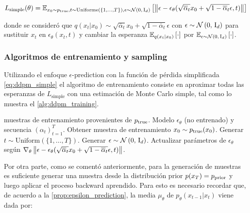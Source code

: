 \begin{equation}
    \label{eq:ddpm_simple}
    L_{\text{simple}}(\theta) = \mathbb{E}_{x_0\sim p_{\operatorname{true}},t\sim\operatorname{Uniforme}\left(\{1,\ldots,T\}\right),\epsilon\sim\mathcal{N}\left(0,\,\operatorname{I}_{d}\right)}\left[\left\lVert \epsilon-\epsilon_\theta(\sqrt{\overline{\alpha}_t}x_0+\sqrt{1-\overline{\alpha}_t}\epsilon,t) \right\rVert\right]
\end{equation}

donde se consideró que $q(x_t|x_0)\sim \sqrt{\overline{\alpha}_t}x_0 + \sqrt{1-\overline{\alpha}_t}\epsilon$ con $\epsilon\sim\mathcal{N}\left(0,\,\operatorname{I}_{d}\right)$ para sustituir $x_t$ en $\epsilon_\theta(x_t,t)$ y cambiar la esperanza $\mathbb{E}_{q(x_t|x_0)}\left[\cdot\right]$ por $\mathbb{E}_{\epsilon\sim\mathcal{N}\left(0,\,\operatorname{I}_{d}\right)}\left[\cdot\right]$.

\subsubsection{Algoritmos de entrenamiento y sampling}

Utilizando el enfoque $\epsilon$-prediction con la función de pérdida simplificada \eqref{eq:ddpm_simple} el algoritmo de entrenamiento consiste en aproximar todas las esperanzas de $L_\text{simple}$ con una estimación de Monte Carlo simple, tal como lo muestra el \autoref{alg:ddpm_training}.

\begin{algorithm}
    \caption{Entrenamiento del modelo DDPM}
    \label{alg:ddpm_training}
    \begin{algorithmic}[1]
        \Require muestras de entrenamiento provenientes de $p_{\operatorname{true}}$.
        \Require Modelo $\epsilon_\theta$ (no entrenado) y secuencia $(\alpha_t)_{t=1}^T$.
        \State Obtener muestra de entrenamiento $x_0\sim p_{\operatorname{true}}(x_0)$.
        \State Generar $t\sim\text{Uniform}\left(\{1,\ldots,T\}\right)$.
        \State Generar $\epsilon\sim\mathcal{N}\left(0,\,\operatorname{I}_{d}\right)$.
        \State Actualizar parámetros de $\epsilon_\theta$ según $\nabla_\theta \left\lVert \epsilon-\epsilon_\theta(\sqrt{\overline{\alpha}_t}x_0+\sqrt{1-\overline{\alpha}_t}\epsilon,t) \right\rVert$.
        \EndWhile
    \end{algorithmic}
\end{algorithm}

Por otra parte, como se comentó anteriormente, para la generación de muestras es suficiente generar una muestra desde la distribución prior $p(x_T)=p_{\operatorname{prior}}$ y luego aplicar el proceso backward aprendido. Para esto es necesario recordar que, de acuerdo a la \autoref{prop:epsilon_prediction}, la media $\mu_\theta$ de $p_\theta(x_{t-1}|x_t)$ viene dada por:

